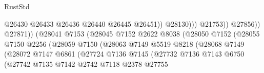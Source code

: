 \begin{lexlean}{RustStd}
\begin{coremodule}
                                                          @26430
                                                          @26433
                                                          @26436
                                                          @26440
                                                          @26445
                                                          @26451))
                                                      @28130)))
                                                @21753))
                                            @27856))
                                        @27871))
                                    (@28041
                                      @7153
                                      (@28045
                                        @7152
                                        @2622
                                        @8038
                                        (@28050
                                          @7152
                                          (@28055
                                            @7150
                                            @2256
                                            (@28059
                                              @7150
                                              (@28063
                                                @7149
                                                @5519
                                                @8218
                                                (@28068
                                                  @7149
                                                  (@28072
                                                    @7147
                                                    @6861
                                                    (@27724
                                                      @7136
                                                      @7145
                                                      (@27732
                                                        @7136
                                                        @7143
                                                        @6750
                                                        (@27742
                                                          @7135
                                                          @7142
                                                          @2742
                                                          @7118
                                                          @2378
                                                          @27755

\end{coremodule}
\end{lexlean}
